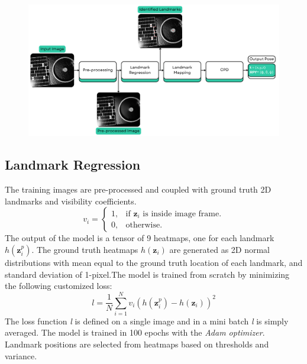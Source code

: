 \begin{figure}[t]
\centering
\includegraphics[scale=0.5]{Online Pipeline.png}
\label{fig}
\end{figure}

\subsection{Landmark Regression}
The training images are pre-processed and coupled with ground truth 2D landmarks and visibility coefficients.
\[
  v_{i}=\begin{cases}
    1, & \text{if $\textbf{z}_{i}$ is inside image frame}.\\
    0, & \text{otherwise}.
  \end{cases}
\]
The output of the model is a tensor of 9 heatmaps, one for each landmark $h(\textbf{z}_{i}^p)$. The ground truth heatmaps $h(\textbf{z}_{i})$ are generated as 2D normal distributions with mean equal to the ground truth location of each landmark, and standard deviation of 1-pixel.The model is trained from scratch by minimizing the following customized loss:
\[l = \frac{1}{N}\sum_{i=1}^N v_i(h(\textbf{z}_{i}^p) - h(\textbf{z}_{i}))^2\]
The loss function \textit{l} is defined on a single image and in a mini batch \textit{l} is simply averaged. The model is trained in 100 epochs with the \textit{Adam optimizer}.
Landmark positions are selected from heatmaps based on thresholds and variance.
